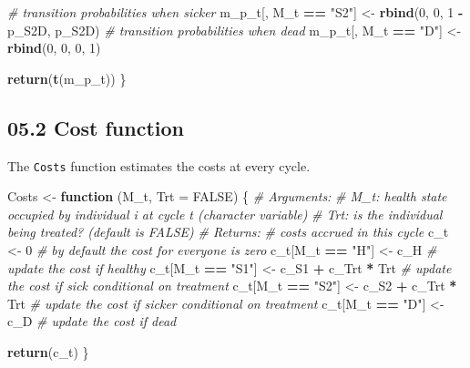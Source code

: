 \documentclass[
]{article}
\newenvironment{Shaded}{\begin{snugshade}}{\end{snugshade}}
\newcommand{\CommentTok}[1]{\textcolor[rgb]{0.56,0.35,0.01}{\textit{#1}}}
\newcommand{\ControlFlowTok}[1]{\textcolor[rgb]{0.13,0.29,0.53}{\textbf{#1}}}
\newcommand{\DataTypeTok}[1]{\textcolor[rgb]{0.13,0.29,0.53}{#1}}
\newcommand{\DecValTok}[1]{\textcolor[rgb]{0.00,0.00,0.81}{#1}}
\newcommand{\KeywordTok}[1]{\textcolor[rgb]{0.13,0.29,0.53}{\textbf{#1}}}
\newcommand{\NormalTok}[1]{#1}
\newcommand{\OperatorTok}[1]{\textcolor[rgb]{0.81,0.36,0.00}{\textbf{#1}}}
\newcommand{\OtherTok}[1]{\textcolor[rgb]{0.56,0.35,0.01}{#1}}
\newcommand{\StringTok}[1]{\textcolor[rgb]{0.31,0.60,0.02}{#1}}
\begin{document}
\begin{Shaded}
\begin{Highlighting}[]
  \CommentTok{# transition probabilities when sicker}
\NormalTok{  m_p_t[, M_t }\OperatorTok{==}\StringTok{ "S2"}\NormalTok{] <-}\StringTok{ }\KeywordTok{rbind}\NormalTok{(}\DecValTok{0}\NormalTok{, }\DecValTok{0}\NormalTok{, }\DecValTok{1} \OperatorTok{-}\StringTok{ }\NormalTok{p_S2D, p_S2D)                                            }
  \CommentTok{# transition probabilities when dead   }
\NormalTok{  m_p_t[, M_t }\OperatorTok{==}\StringTok{ "D"}\NormalTok{]  <-}\StringTok{ }\KeywordTok{rbind}\NormalTok{(}\DecValTok{0}\NormalTok{, }\DecValTok{0}\NormalTok{, }\DecValTok{0}\NormalTok{, }\DecValTok{1}\NormalTok{)                                                        }
  
  \KeywordTok{return}\NormalTok{(}\KeywordTok{t}\NormalTok{(m_p_t))}
\NormalTok{\}       }
\end{Highlighting}
\end{Shaded}

\hypertarget{cost-function}{%
\subsection{05.2 Cost function}\label{cost-function}}

The \texttt{Costs} function estimates the costs at every cycle.

\begin{Shaded}
\begin{Highlighting}[]
\NormalTok{Costs <-}\StringTok{ }\ControlFlowTok{function}\NormalTok{ (M_t, }\DataTypeTok{Trt =} \OtherTok{FALSE}\NormalTok{) \{}
  \CommentTok{# Arguments:}
    \CommentTok{# M_t: health state occupied by individual i at cycle t (character variable)}
    \CommentTok{# Trt: is the individual being treated? (default is FALSE) }
  \CommentTok{# Returns:}
    \CommentTok{# costs accrued in this cycle}
\NormalTok{  c_t <-}\StringTok{ }\DecValTok{0}                                 \CommentTok{# by default the cost for everyone is zero }
\NormalTok{  c_t[M_t }\OperatorTok{==}\StringTok{ "H"}\NormalTok{]  <-}\StringTok{ }\NormalTok{c_H                  }\CommentTok{# update the cost if healthy}
\NormalTok{  c_t[M_t }\OperatorTok{==}\StringTok{ "S1"}\NormalTok{] <-}\StringTok{ }\NormalTok{c_S1 }\OperatorTok{+}\StringTok{ }\NormalTok{c_Trt }\OperatorTok{*}\StringTok{ }\NormalTok{Trt   }\CommentTok{# update the cost if sick conditional on treatment}
\NormalTok{  c_t[M_t }\OperatorTok{==}\StringTok{ "S2"}\NormalTok{] <-}\StringTok{ }\NormalTok{c_S2 }\OperatorTok{+}\StringTok{ }\NormalTok{c_Trt }\OperatorTok{*}\StringTok{ }\NormalTok{Trt   }\CommentTok{# update the cost if sicker conditional on treatment}
\NormalTok{  c_t[M_t }\OperatorTok{==}\StringTok{ "D"}\NormalTok{]  <-}\StringTok{ }\NormalTok{c_D                  }\CommentTok{# update the cost if dead}
  
  \KeywordTok{return}\NormalTok{(c_t) }
\NormalTok{\}}
\end{Highlighting}
\end{Shaded}
\end{document}
